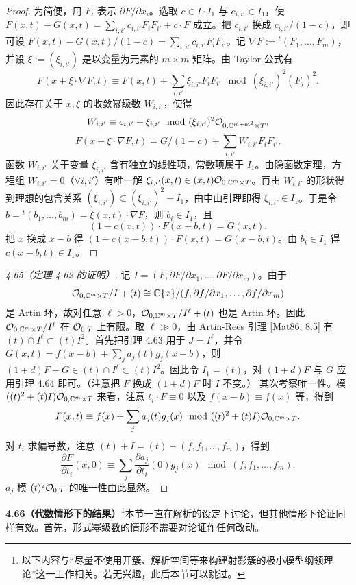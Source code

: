 \begin{proof}
为简便，用 $F_i$ 表示 $\partial F/\partial x_i$。选取 $c\in I\cdot I_1$ 与 $c_{i,i'}\in I_1$，使 $F(x,t)-G(x,t)=\sum_{i,i'}c_{i,i'}F_iF_{i'}+c\cdot F$ 成立。把 $c_{i,i'}$ 换成 $c_{i,i'}/(1-c)$，即可设 $F(x,t)-G(x,t)/(1-c)=\sum_{i,i'}c_{i,i'}F_iF_{i'}$。记 $\nabla F:={}^t(F_1,\dots,F_m)$，并设 $\xi:=(\xi_{i,i'})$ 是以变量为元素的 $m\times m$ 矩阵。由 Taylor 公式有
\[ F(x+\xi\cdot\nabla F,t)\equiv F(x,t)+\sum_{i,i'}\xi_{i,i'}F_iF_{i'}\mod(\xi_{i,i'})^2(F_j)^2. \]
因此存在关于 $x,\xi$ 的收敛幂级数 $W_{i,i'}$，使得
\[ W_{i,i'}\equiv c_{i,i'}+\xi_{i,i'}\mod(\xi_{i,i'})^2\mathcal{O}_{0,\mathbb{C}^{m+m^2}\times T}, \]
\[ F(x+\xi\cdot\nabla F,t)=G/(1-c)+\sum_{i,i'}W_{i,i'}F_iF_{i'}. \]
函数 $W_{i,i'}$ 关于变量 $\xi_{i,i'}$ 含有独立的线性项，常数项属于 $I_1$。由隐函数定理，方程组 $W_{i,i'}=0$（$\forall i,i'$）有唯一解 $\xi_{i,i'}(x,t)\in(x,t)\mathcal{O}_{0,\mathbb{C}^m\times T}$。再由 $W_{i,i'}$ 的形状得到理想的包含关系 $(\xi_{i,i'})\subset(\xi_{i,i'})^2+I_1$，由中山引理即得 $\xi_{i,i'}\in I_1$。于是令 $b={}^t(b_1,\dots,b_m)=\xi(x,t)\cdot\nabla F$，则 $b_i\in I_1$，且
\[ (1-c(x,t))\cdot F(x+b,t)=G(x,t). \]
把 $x$ 换成 $x-b$ 得 $(1-c(x-b,t))\cdot F(x,t)=G(x-b,t)$。由 $b_i\in I_1$ 得 $c(x-b,t)\in I_1$。
\end{proof}

\begin{proof}[4.65（定理 4.62 的证明）]
记 $I=(F,\partial F/\partial x_1,\dots,\partial F/\partial x_m)$。由于
\[ \mathcal{O}_{0,\mathbb{C}^m\times T}/I+(t)\cong\mathbb{C}\{x\}/(f,\partial f/\partial x_1,\dots,\partial f/\partial x_m) \]
是 Artin 环，故对任意 $\ell>0$，$\mathcal{O}_{0,\mathbb{C}^m\times T}/I^\ell+(t)$ 也是 Artin 环。因此 $\mathcal{O}_{0,\mathbb{C}^m\times T}/I^\ell$ 在 $\mathcal{O}_{0,T}$ 上有限。取 $\ell\gg0$，由 Artin-Rees 引理 [Mat86, 8.5] 有 $(t)\cap I^\ell\subset(t)I^2$。首先把引理 4.63 用于 $J=I^\ell$，并令 $G(x,t)=f(x-b)+\sum_ja_j(t)g_j(x-b)$，则 $(1+d)F-G\in(t)\cap I^\ell\subset(t)I^2$。因此令 $I_1=(t)$，对 $(1+d)F$ 与 $G$ 应用引理 4.64 即可。（注意把 $F$ 换成 $(1+d)F$ 时 $I$ 不变。）
其次考察唯一性。模 $((t)^2+(t)I)\mathcal{O}_{0,\mathbb{C}^m\times T}$ 来看，注意 $t_i\cdot F\equiv0$ 以及 $f(x-b)\equiv f(x)$ 等，得到
\[ F(x,t)\equiv f(x)+\sum_ja_j(t)g_j(x)\mod((t)^2+(t)I)\mathcal{O}_{0,\mathbb{C}^m\times T}. \]
对 $t_i$ 求偏导数，注意 $(t)+I=(t)+(f,f_1,\dots,f_m)$，得到
\[ \frac{\partial F}{\partial t_i}(x,0)\equiv\sum_j\frac{\partial a_j}{\partial t_i}(0)g_j(x)\mod(f,f_1,\dots,f_m). \]
$a_j$ 模 $(t)^2\mathcal{O}_{0,T}$ 的唯一性由此显然。
\end{proof}

\par\medskip\noindent\textbf{4.66（代数情形下的结果）}\footnote{以下内容与“尽量不使用开簇、解析空间等来构建射影簇的极小模型纲领理论”这一工作相关。若无兴趣，此后本节可以跳过。}\quad 本节一直在解析的设定下讨论，但其他情形下论证同样有效。首先，形式幂级数的情形不需要对论证作任何改动。

